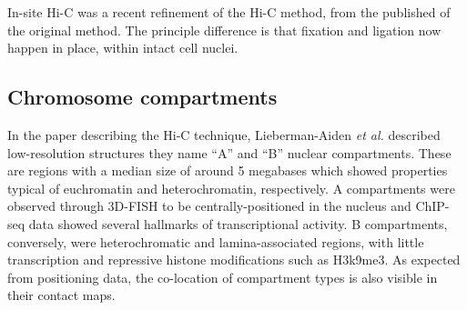 \documentclass[a4paper,10pt,oneside]{book}
\begin{document}
In-site Hi-C was a recent refinement of the Hi-C method, from the published of the original method.\cite{Rao2014} The principle difference is that fixation and ligation now happen in place, within intact cell nuclei.

\subsection{Chromosome compartments}

In the paper describing the Hi-C technique,\cite{Lieberman2009}  Lieberman-Aiden \emph{et
  al.} described low-resolution structures they name  ``A'' and ``B'' nuclear compartments. These are regions with a median size of around 5 megabases which showed properties typical
of euchromatin and heterochromatin, respectively. A compartments were observed through 3D-FISH to be centrally-positioned in the nucleus and  ChIP-seq data showed several hallmarks of transcriptional activity. B compartments, conversely, were heterochromatic and lamina-associated regions, with little transcription and repressive histone modifications such as H3k9me3.\cite{Lieberman2009, DeWit2012} As expected from positioning data, the co-location of compartment types is also visible in their contact maps. \\
\end{document}
